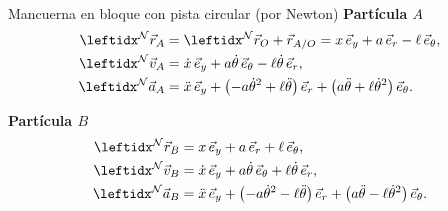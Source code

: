 \begin{solucion}{Mancuerna en bloque con pista circular (por Newton)}
\textbf{Partícula $A$}
$$\begin{aligned}
\marc{\vec{r}_A}{N}{} &= \marc{\vec{r}_O}{N}{}+\vec{r}_{A/O} = x\,\vec{e}_y + a\,\vec{e}_r - \ell\,\vec{e}_\theta,\\
\marc{\vec{v}_A}{N}{} &= \dot{x}\,\vec{e}_y + a\dot{\theta}\,\vec{e}_\theta - \ell\dot{\theta}\,\vec{e}_r,\\
\marc{\vec{a}_A}{N}{} &= \ddot{x}\,\vec{e}_y + \left(-a\dot{\theta}^2+\ell\ddot{\theta}\right)\vec{e}_r + \left(a\ddot{\theta}+\ell\dot{\theta}^2\right)\vec{e}_\theta.
\end{aligned}$$

\textbf{Partícula $B$}
$$\begin{aligned}
\marc{\vec{r}_B}{N}{} &= x\,\vec{e}_y + a\,\vec{e}_r + \ell\,\vec{e}_\theta,\\
\marc{\vec{v}_B}{N}{} &= \dot{x}\,\vec{e}_y + a\dot{\theta}\,\vec{e}_\theta + \ell\dot{\theta}\,\vec{e}_r,\\
\marc{\vec{a}_B}{N}{} &= \ddot{x}\,\vec{e}_y + \left(-a\dot{\theta}^2-\ell\ddot{\theta}\right)\vec{e}_r + \left(a\ddot{\theta}-\ell\dot{\theta}^2\right)\vec{e}_\theta.
\end{aligned}$$


\end{solucion}
